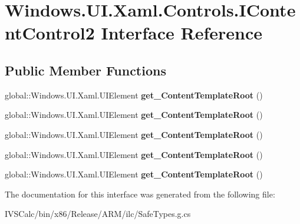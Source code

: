 \hypertarget{interface_windows_1_1_u_i_1_1_xaml_1_1_controls_1_1_i_content_control2}{}\section{Windows.\+U\+I.\+Xaml.\+Controls.\+I\+Content\+Control2 Interface Reference}
\label{interface_windows_1_1_u_i_1_1_xaml_1_1_controls_1_1_i_content_control2}
\subsection*{Public Member Functions}
\begin{DoxyCompactItemize}
\item 
\mbox{\label{interface_windows_1_1_u_i_1_1_xaml_1_1_controls_1_1_i_content_control2_a79bc77cf791f77b1be5e7535b4a34e1b}} 
global\+::\+Windows.\+U\+I.\+Xaml.\+U\+I\+Element {\bfseries get\+\_\+\+Content\+Template\+Root} ()
\item 
\mbox{\label{interface_windows_1_1_u_i_1_1_xaml_1_1_controls_1_1_i_content_control2_a79bc77cf791f77b1be5e7535b4a34e1b}} 
global\+::\+Windows.\+U\+I.\+Xaml.\+U\+I\+Element {\bfseries get\+\_\+\+Content\+Template\+Root} ()
\item 
\mbox{\label{interface_windows_1_1_u_i_1_1_xaml_1_1_controls_1_1_i_content_control2_a79bc77cf791f77b1be5e7535b4a34e1b}} 
global\+::\+Windows.\+U\+I.\+Xaml.\+U\+I\+Element {\bfseries get\+\_\+\+Content\+Template\+Root} ()
\item 
\mbox{\label{interface_windows_1_1_u_i_1_1_xaml_1_1_controls_1_1_i_content_control2_a79bc77cf791f77b1be5e7535b4a34e1b}} 
global\+::\+Windows.\+U\+I.\+Xaml.\+U\+I\+Element {\bfseries get\+\_\+\+Content\+Template\+Root} ()
\item 
\mbox{\label{interface_windows_1_1_u_i_1_1_xaml_1_1_controls_1_1_i_content_control2_a79bc77cf791f77b1be5e7535b4a34e1b}} 
global\+::\+Windows.\+U\+I.\+Xaml.\+U\+I\+Element {\bfseries get\+\_\+\+Content\+Template\+Root} ()
\end{DoxyCompactItemize}


The documentation for this interface was generated from the following file\+:\begin{DoxyCompactItemize}
\item 
I\+V\+S\+Calc/bin/x86/\+Release/\+A\+R\+M/ilc/Safe\+Types.\+g.\+cs\end{DoxyCompactItemize}
